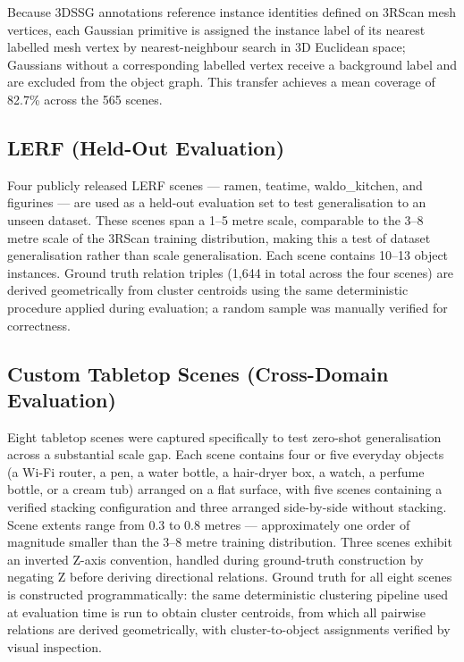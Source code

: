 \documentclass[sn-mathphys,Numbered]{sn-jnl}
\begin{document}
Because 3DSSG annotations reference instance identities defined on 3RScan mesh vertices, each Gaussian primitive is assigned the instance label of its nearest labelled mesh vertex by nearest-neighbour search in 3D Euclidean space; Gaussians without a corresponding labelled vertex receive a background label and are excluded from the object graph. This transfer achieves a mean coverage of 82.7\% across the 565 scenes.

\FloatBarrier
\subsection{LERF (Held-Out Evaluation)}\label{subsec3-2}

Four publicly released LERF \cite{kerr2023lerf} scenes --- ramen, teatime, waldo\_kitchen, and figurines --- are used as a held-out evaluation set to test generalisation to an unseen dataset. These scenes span a 1--5 metre scale, comparable to the 3--8 metre scale of the 3RScan training distribution, making this a test of dataset generalisation rather than scale generalisation. Each scene contains 10--13 object instances. Ground truth relation triples (1,644 in total across the four scenes) are derived geometrically from cluster centroids using the same deterministic procedure applied during evaluation; a random sample was manually verified for correctness.

\FloatBarrier
\subsection{Custom Tabletop Scenes (Cross-Domain Evaluation)}\label{subsec3-3}

Eight tabletop scenes were captured specifically to test zero-shot generalisation across a substantial scale gap. Each scene contains four or five everyday objects (a Wi-Fi router, a pen, a water bottle, a hair-dryer box, a watch, a perfume bottle, or a cream tub) arranged on a flat surface, with five scenes containing a verified stacking configuration and three arranged side-by-side without stacking. Scene extents range from 0.3 to 0.8 metres --- approximately one order of magnitude smaller than the 3--8 metre training distribution. Three scenes exhibit an inverted Z-axis convention, handled during ground-truth construction by negating Z before deriving directional relations. Ground truth for all eight scenes is constructed programmatically: the same deterministic clustering pipeline used at evaluation time is run to obtain cluster centroids, from which all pairwise relations are derived geometrically, with cluster-to-object assignments verified by visual inspection.
\end{document}
